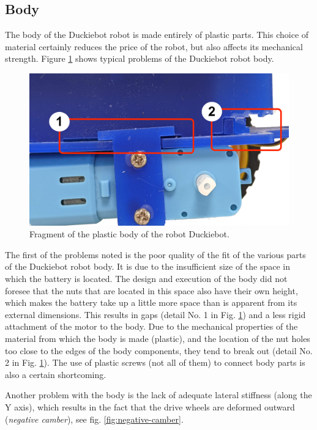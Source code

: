 \documentclass[conference]{IEEEtran}
\begin{document}
\subsection{Body}
The body of the Duckiebot robot is made entirely of plastic parts. This choice of material certainly reduces the price of the robot, but also affects its mechanical strength. Figure \ref{fig:chassis-problem} shows typical problems of the Duckiebot robot body.

\begin{figure}
    \centering
    \includegraphics[width=1.0\columnwidth]{chassis1.png}
    \caption{Fragment of the plastic body of the robot Duckiebot.}
    \label{fig:chassis-problem}
\end{figure}

The first of the problems noted is the poor quality of the fit of the various parts of the Duckiebot robot body. It is due to the insufficient size of the space in which the battery is located. The design and execution of the body did not foresee that the nuts that are located in this space also have their own height, which makes the battery take up a little more space than is apparent from its external dimensions. This results in gaps (detail No. 1 in Fig. \ref{fig:chassis-problem}) and a less rigid attachment of the motor to the body. Due to the mechanical properties of the material from which the body is made (plastic), and the location of the nut holes too close to the edges of the body components, they tend to break out (detail No. 2 in Fig. \ref{fig:chassis-problem}). The use of plastic screws (not all of them) to connect body parts is also a certain shortcoming.

Another problem with the body is the lack of adequate lateral stiffness (along the Y axis), which results in the fact that the drive wheels are deformed outward (\emph{negative camber}), see fig. \ref{fig:negative-camber}. 
\end{document}
